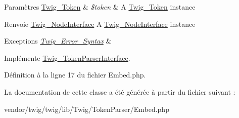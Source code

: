 \begin{DoxyParams}[1]{Paramètres}
\hyperlink{class_twig___token}{Twig\+\_\+\+Token} & {\em \$token} & A \hyperlink{class_twig___token}{Twig\+\_\+\+Token} instance\\
\hline
\end{DoxyParams}
\begin{DoxyReturn}{Renvoie}
\hyperlink{interface_twig___node_interface}{Twig\+\_\+\+Node\+Interface} A \hyperlink{interface_twig___node_interface}{Twig\+\_\+\+Node\+Interface} instance
\end{DoxyReturn}

\begin{DoxyExceptions}{Exceptions}
{\em \hyperlink{class_twig___error___syntax}{Twig\+\_\+\+Error\+\_\+\+Syntax}} & \\
\hline
\end{DoxyExceptions}


Implémente \hyperlink{interface_twig___token_parser_interface_a5dfa2e269321584fb74e8b43dabe0efd}{Twig\+\_\+\+Token\+Parser\+Interface}.



Définition à la ligne 17 du fichier Embed.\+php.



La documentation de cette classe a été générée à partir du fichier suivant \+:\begin{DoxyCompactItemize}
\item 
vendor/twig/twig/lib/\+Twig/\+Token\+Parser/Embed.\+php\end{DoxyCompactItemize}

